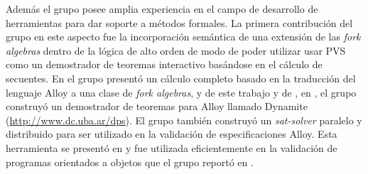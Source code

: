 \documentclass[a4paper, 11pt]{article}
\begin{document}
Además el grupo posee amplia experiencia en el campo de desarrollo de herramientas para dar soporte a métodos formales. La primera contribución del grupo en este aspecto \cite{lopezpombo:SRI-CSL-02-04} fue la incorporación semántica de una extensión de las \emph{fork algebras} dentro de la lógica de alto orden de modo de poder utilizar usar PVS \cite{owre:cade92} como un demostrador de teoremas interactivo basándose en el cálculo de secuentes. En \cite{frias:icfem04} el grupo presentó un cálculo completo basado en la traducción del lenguaje {\sf Alloy} a una clase de \emph{fork algebras}, y de este trabajo y de \cite{lopezpombo:SRI-CSL-02-04}, en \cite{frias:tacas07}, el grupo construyó un demostrador de teoremas para {\sf Alloy} llamado Dynamite (\url{http://www.dc.uba.ar/dps}). El grupo también construyó un \emph{sat-solver} paralelo y distribuido para ser utilizado en la validación de especificaciones {\sf Alloy}. Esta herramienta se presentó en \cite{rosner:abz10} y fue utilizada eficientemente en la validación de programas orientados a objetos que el grupo reportó en \cite{galeotti:apv09,galeotti:issta10}.

\begin{small}


\end{small}
\end{document}
